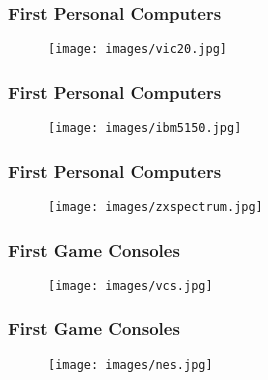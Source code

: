 \documentclass[aspectratio=43]{uva-inf-presentation}
\begin{document}

\begin{frame}
\frametitle{First Personal Computers}

\begin{figure}
\texttt{[image: images/vic20.jpg]}
\end{figure}

\end{frame}


\begin{frame}
\frametitle{First Personal Computers}

\begin{figure}
\texttt{[image: images/ibm5150.jpg]}
\end{figure}

\end{frame}


\begin{frame}
\frametitle{First Personal Computers}

\begin{figure}
\texttt{[image: images/zxspectrum.jpg]}
\end{figure}

\end{frame}


\begin{frame}
\frametitle{First Game Consoles}

\begin{figure}
\texttt{[image: images/vcs.jpg]}
\end{figure}

\end{frame}


\begin{frame}
\frametitle{First Game Consoles}

\begin{figure}
\texttt{[image: images/nes.jpg]}
\end{figure}

\end{frame}

\end{document}
